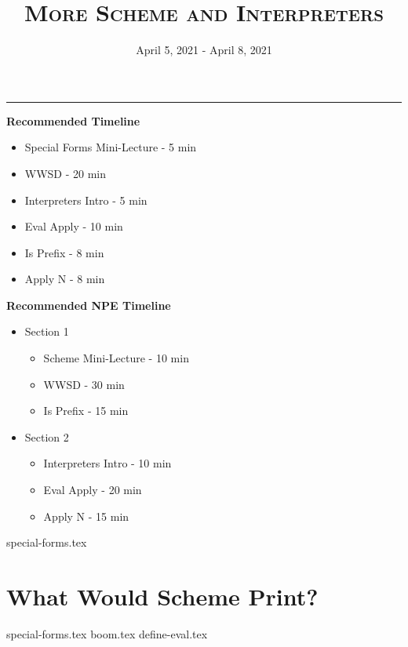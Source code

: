 \documentclass{exam}
\title{\textsc{More Scheme and Interpreters}}
\date{April 5, 2021 - April 8, 2021}
\begin{document}
\maketitle
\rule{\textwidth}{0.15em}
\fontsize{12}{15}\selectfont


\begin{blocksection}
\begin{guide}
\textbf{Recommended Timeline}
\begin{itemize}
  \item Special Forms Mini-Lecture - 5 min
  \item WWSD - 20 min
  \item Interpreters Intro - 5 min
  \item Eval Apply - 10 min
  \item Is Prefix - 8 min
  \item Apply N - 8 min
\end{itemize}
\end{guide}
\end{blocksection}

\begin{blocksection}
\begin{guide}
\textbf{Recommended NPE Timeline}
  \begin{itemize}
  \item Section 1
  \begin{itemize}
    \item Scheme Mini-Lecture - 10 min
    \item WWSD - 30 min
    \item Is Prefix - 15 min
  \end{itemize}
  \item Section 2
  \begin{itemize}
    \item Interpreters Intro - 10 min
    \item Eval Apply - 20 min
    \item Apply N - 15 min
  \end{itemize}
\end{itemize}
\end{guide}
\end{blocksection}



{special-forms.tex}
\section{What Would Scheme Print?}
\begin{questions}
{special-forms.tex}
{boom.tex}
{define-eval.tex}
\end{questions}
\end{document}
